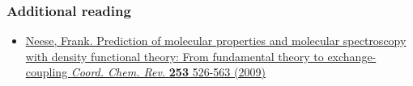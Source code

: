 \documentclass[]{article}
\providecommand{\tightlist}{%
  \setlength{\itemsep}{0pt}\setlength{\parskip}{0pt}}
\begin{document}
\hypertarget{additional-reading}{%
\subsubsection{Additional reading}\label{additional-reading}}

\begin{itemize}
\tightlist
\item
  \href{https://dx.doi.org/10.1016/j.ccr.2008.05.014}{Neese, Frank.
  Prediction of molecular properties and molecular spectroscopy with
  density functional theory: From fundamental theory to
  exchange-coupling \emph{Coord. Chem. Rev.} \textbf{253} 526-563
  (2009)}
\end{itemize}
\end{document}
